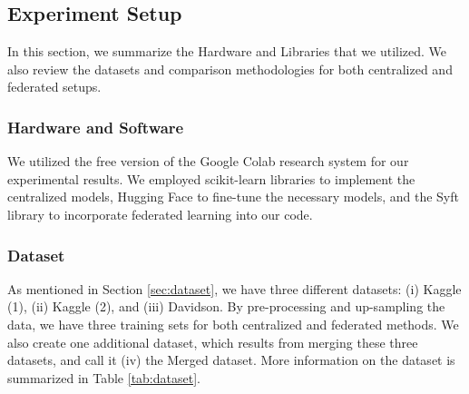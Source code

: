 \documentclass[11pt]{article}
\begin{document}
\subsection{Experiment Setup}
In this section, we summarize the Hardware and Libraries that we utilized. We also review the datasets and comparison methodologies for both centralized and federated setups. 

\subsubsection{Hardware and Software}
We utilized the free version of the Google Colab research system for our experimental results. We employed scikit-learn libraries to implement the centralized models, Hugging Face to fine-tune the necessary models, and the Syft library to incorporate federated learning into our code.


\subsubsection{Dataset}
As mentioned in Section \ref{sec:dataset}, we have three different datasets: (i) Kaggle (1), (ii) Kaggle (2), and (iii) Davidson. By pre-processing and up-sampling the data, we have three training sets for both centralized and federated methods. We also create one additional dataset, which results from merging these three datasets, and call it (iv) the Merged dataset. More information on the dataset is summarized in Table \ref{tab:dataset}.


\begin{table}[]
\centering
\caption{Data Information}
\label{tab:dataset}
\end{table}
\end{document}
